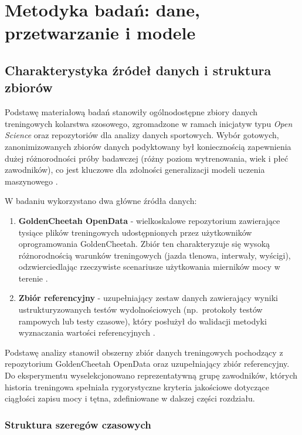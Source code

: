 
\chapter{Metodyka badań: dane, przetwarzanie i modele}

\section{Charakterystyka źródeł danych i struktura zbiorów}

Podstawę materiałową badań stanowiły ogólnodostępne zbiory danych treningowych kolarstwa szosowego, zgromadzone w ramach inicjatyw typu \textit{Open Science} oraz repozytoriów dla analizy danych sportowych.
Wybór gotowych, zanonimizowanych zbiorów danych podyktowany był koniecznością zapewnienia dużej różnorodności próby badawczej (różny poziom wytrenowania, wiek i płeć zawodników), co jest kluczowe dla zdolności generalizacji modeli uczenia maszynowego \cite{stockwell2023mlftp}.

W badaniu wykorzystano dwa główne źródła danych:
\begin{enumerate}
  \item \textbf{GoldenCheetah OpenData} - wielkoskalowe repozytorium zawierające tysiące plików treningowych udostępnionych przez użytkowników oprogramowania GoldenCheetah.
  Zbiór ten charakteryzuje się wysoką różnorodnością warunków treningowych (jazda tlenowa, interwały, wyścigi), odzwierciedlając rzeczywiste scenariusze użytkowania mierników mocy w terenie \cite{kaggle_cycling_data}.
  \item \textbf{Zbiór referencyjny} - uzupełniający zestaw danych zawierający wyniki ustrukturyzowanych testów wydolnościowych (np.\ protokoły testów rampowych lub testy czasowe), który posłużył do walidacji metodyki wyznaczania wartości referencyjnych \cite{figshare_cycling_data}.
\end{enumerate}

Podstawę analizy stanowił obszerny zbiór danych treningowych pochodzący z repozytorium GoldenCheetah OpenData oraz uzupełniający zbiór referencyjny. Do eksperymentu wyselekcjonowano reprezentatywną grupę zawodników, których historia treningowa spełniała rygorystyczne kryteria jakościowe dotyczące ciągłości zapisu mocy i tętna, zdefiniowane w dalszej części rozdziału.
\subsection{Struktura szeregów czasowych}

